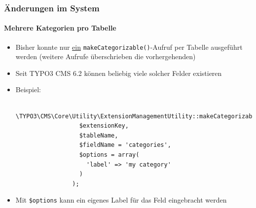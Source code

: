 \begin{frame}[fragile]
	\frametitle{Änderungen im System}
	\framesubtitle{Mehrere Kategorien pro Tabelle}

	\begin{itemize}
		\item Bisher konnte nur \underline{ein} \texttt{makeCategorizable()}-Aufruf per Tabelle ausgeführt werden\newline
			\small(weitere Aufrufe überschrieben die vorhergehenden)\normalsize
		\item Seit TYPO3 CMS 6.2 können beliebig viele solcher Felder existieren
		\item Beispiel:

			\begin{lstlisting}
				\TYPO3\CMS\Core\Utility\ExtensionManagementUtility::makeCategorizable(
				  $extensionKey,
				  $tableName,
				  $fieldName = 'categories',
				  $options = array(
				  	'label' => 'my category'
				  )
				);
			\end{lstlisting}

		\item Mit \texttt{\$options} kann ein eigenes Label für das Feld eingebracht werden

	\end{itemize}

\end{frame}


